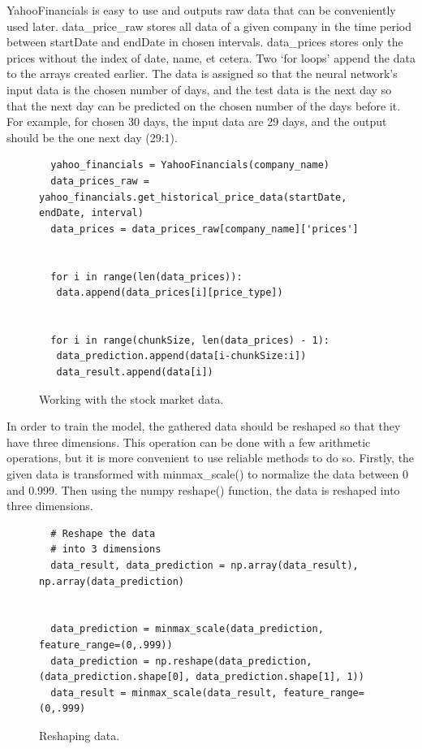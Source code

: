 YahooFinancials is easy to use and outputs raw data that can be conveniently used later. data{\_}price{\_}raw stores all data of a given company in the time period between startDate and endDate in chosen intervals. data{\_}prices stores only the prices without the index of date, name, et cetera.
Two ‘for loops’ append the data to the arrays created earlier. The data is assigned so that the neural network’s input data is the chosen number of days, and the test data is the next day so that the next day can be predicted on the chosen number of the days before it. For example, for chosen 30 days, the input data are 29 days, and the output should be the one next day (29:1).

\clearpage
\begin{figure}
\centering
\begin{lstlisting}
  yahoo_financials = YahooFinancials(company_name)
  data_prices_raw = yahoo_financials.get_historical_price_data(startDate, endDate, interval)
  data_prices = data_prices_raw[company_name]['prices']
  
  
  for i in range(len(data_prices)):
   data.append(data_prices[i][price_type])
  
  
  for i in range(chunkSize, len(data_prices) - 1):
   data_prediction.append(data[i-chunkSize:i])
   data_result.append(data[i])
\end{lstlisting}
\caption{Working with the stock market data.}
\label{fig:pseudocode:listings}
\end{figure}

In order to train the model, the gathered data should be reshaped so that they have three dimensions. This operation can be done with a few arithmetic operations, but it is more convenient to use reliable methods to do so. Firstly, the given data is transformed with minmax{\_}scale() to normalize the data between 0 and 0.999. Then using the numpy reshape() function, the data is reshaped into three dimensions.

\clearpage
\begin{figure}
\centering
\begin{lstlisting}
  # Reshape the data
  # into 3 dimensions
  data_result, data_prediction = np.array(data_result), np.array(data_prediction)
  
  
  data_prediction = minmax_scale(data_prediction, feature_range=(0,.999))
  data_prediction = np.reshape(data_prediction, (data_prediction.shape[0], data_prediction.shape[1], 1))
  data_result = minmax_scale(data_result, feature_range=(0,.999)
\end{lstlisting}
\caption{Reshaping data.}
\label{fig:pseudocode:listings}
\end{figure}

